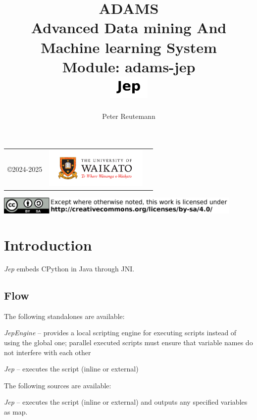 \documentclass[a4paper]{book}
\title{
  \textbf{ADAMS} \\
  {\Large \textbf{A}dvanced \textbf{D}ata mining \textbf{A}nd \textbf{M}achine
  learning \textbf{S}ystem} \\
  {\Large Module: adams-jep} \\
  \vspace{1cm}
  \includegraphics[width=2cm]{images/jep-module.png} \\
}
\author{
  Peter Reutemann
}
\begin{document}
\begin{titlepage}
\maketitle

\thispagestyle{empty}
\center
\begin{table}[b]
	\begin{tabular}{c l l}
		\parbox[c][2cm]{2cm}{\copyright 2024-2025} &
		\parbox[c][2cm]{5cm}{\includegraphics[width=5cm]{images/coat_of_arms.pdf}} \\
	\end{tabular}
	\includegraphics[width=12cm]{images/cc.png} \\
\end{table}

\end{titlepage}

\tableofcontents


\chapter{Introduction}
\textit{Jep} embeds CPython in Java through JNI\cite{jep}.

\section{Flow}
The following standalones are available:
\begin{tight_itemize}
	\item \textit{JepEngine} -- provides a local scripting engine for executing
	scripts instead of using the global one; parallel executed scripts must ensure
	that variable names do not interfere with each other
	\item \textit{Jep} -- executes the script (inline or external)
\end{tight_itemize}
The following sources are available:
\begin{tight_itemize}
	\item \textit{Jep} -- executes the script (inline or external) and outputs any specified variables as map.
\end{tight_itemize}
\end{document}
